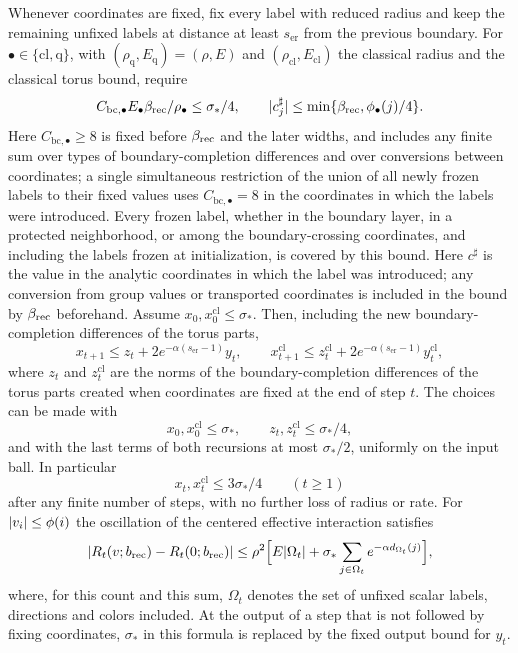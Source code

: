 \begin{theorem}
Whenever coordinates are fixed, fix every label with reduced radius and keep the remaining unfixed labels at distance at least $s_{\mathrm{er}}$ from the previous boundary. For $\bullet\in\{\mathrm{cl},\mathrm q\}$, with $(\rho_{\mathrm q},E_{\mathrm q})=(\rho,E)$ and $(\rho_{\mathrm{cl}},E_{\mathrm{cl}})$ the classical radius and the classical torus bound, require
\[
 C_{\mathrm{bc},\bullet}E_\bullet\beta_{\mathrm{rec}}/\rho_\bullet\le\sigma_*/4,\qquad\lvert c_j^\sharp\rvert\le\min\{\beta_{\mathrm{rec}},\phi_\bullet(j)/4\}.
\]
Here $C_{\mathrm{bc},\bullet}\ge8$ is fixed before $\beta_{\mathrm{rec}}$ and the later widths, and includes any finite sum over types of boundary-completion differences and over conversions between coordinates; a single simultaneous restriction of the union of all newly frozen labels to their fixed values uses $C_{\mathrm{bc},\bullet}=8$ in the coordinates in which the labels were introduced. Every frozen label, whether in the boundary layer, in a protected neighborhood, or among the boundary-crossing coordinates, and including the labels frozen at initialization, is covered by this bound. Here $c^\sharp$ is the value in the analytic coordinates in which the label was introduced; any conversion from group values or transported coordinates is included in the bound by $\beta_{\mathrm{rec}}$ beforehand. Assume $x_0,x_0^{\mathrm{cl}}\le\sigma_*$. Then, including the new boundary-completion differences of the torus parts,
\[
 x_{t+1}\le z_t+2e^{-\alpha(s_{\mathrm{er}}-1)}y_t,\qquad x_{t+1}^{\mathrm{cl}}\le z_t^{\mathrm{cl}}+2e^{-\alpha(s_{\mathrm{er}}-1)}y_t^{\mathrm{cl}},
\]
where $z_t$ and $z_t^{\mathrm{cl}}$ are the norms of the boundary-completion differences of the torus parts created when coordinates are fixed at the end of step $t$. The choices can be made with
\[
 x_0,x_0^{\mathrm{cl}}\le\sigma_*,\qquad z_t,z_t^{\mathrm{cl}}\le\sigma_*/4,
\]
and with the last terms of both recursions at most $\sigma_*/2$, uniformly on the input ball. In particular
\[
 x_t,x_t^{\mathrm{cl}}\le3\sigma_*/4\qquad(t\ge1)
\]
after any finite number of steps, with no further loss of radius or rate. For $\lvert v_i\rvert\le\phi(i)$ the oscillation of the centered effective interaction satisfies
\[
 \lvert R_t(v;b_{\mathrm{rec}})-R_t(0;b_{\mathrm{rec}})\rvert\le\rho^2\Bigl[E\lvert \Omega_t\rvert+\sigma_*\sum_{j\in\Omega_t}e^{-\alpha d_{\Omega_t}(j)}\Bigr],
\]
where, for this count and this sum, $\Omega_t$ denotes the set of unfixed scalar labels, directions and colors included. At the output of a step that is not followed by fixing coordinates, $\sigma_*$ in this formula is replaced by the fixed output bound for $y_t$.


\end{theorem}

